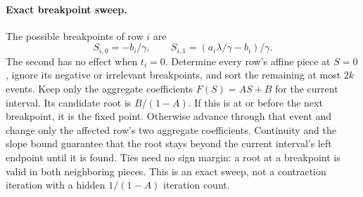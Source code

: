 \paragraph{Exact breakpoint sweep.}
The possible breakpoints of row $i$ are
\[
 S_{i,0}=-b_i/\gamma,\qquad
 S_{i,1}=(a_i\lambda/\gamma-b_i)/\gamma.
\]
The second has no effect when $t_i=0$. Determine every row's affine
piece at $S=0$, ignore its negative or irrelevant breakpoints, and sort
the remaining at most $2k$ events. Keep only the aggregate coefficients
$F(S)=AS+B$ for the current interval. Its candidate root is $B/(1-A)$.
If this is at or before the next breakpoint, it is the fixed point.
Otherwise advance through that event and change only the affected row's
two aggregate coefficients. Continuity and the slope bound guarantee
that the root stays beyond the current interval's left endpoint until it
is found. Ties need no sign margin: a root at a breakpoint is valid in
both neighboring pieces. This is an exact sweep, not a contraction
iteration with a hidden $1/(1-A)$ iteration count.

